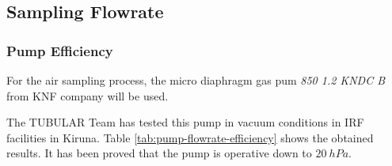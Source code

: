 \subsection{Sampling Flowrate}


\subsubsection{Pump Efficiency}

For the air sampling process, the micro diaphragm gas pum \emph{850 1.2 KNDC B} from KNF company will be used.

The TUBULAR Team has tested this pump in vacuum conditions in IRF facilities in Kiruna. Table \ref{tab:pump-flowrate-efficiency} shows the obtained results. It has been proved that the pump is operative down to $20\ hPa$.

